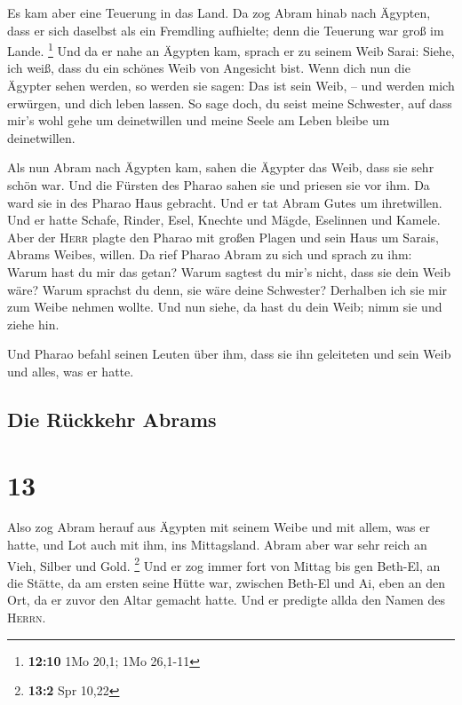  Es kam aber eine Teuerung in das Land. Da zog Abram
hinab nach Ägypten, dass er sich daselbst als ein Fremdling aufhielte;
denn die Teuerung war groß im Lande. \footnote{\textbf{12:10} 1Mo 20,1;
  1Mo 26,1-11}  Und da er nahe an Ägypten kam, sprach er
zu seinem Weib Sarai: Siehe, ich weiß, dass du ein schönes Weib von
Angesicht bist.  Wenn dich nun die Ägypter sehen werden,
so werden sie sagen: Das ist sein Weib, -- und werden mich erwürgen, und
dich leben lassen.  So sage doch, du seist meine
Schwester, auf dass mir's wohl gehe um deinetwillen und meine Seele am
Leben bleibe um deinetwillen.

 Als nun Abram nach Ägypten kam, sahen die Ägypter das
Weib, dass sie sehr schön war.  Und die Fürsten des
Pharao sahen sie und priesen sie vor ihm. Da ward sie in des Pharao Haus
gebracht.  Und er tat Abram Gutes um ihretwillen. Und er
hatte Schafe, Rinder, Esel, Knechte und Mägde, Eselinnen und Kamele.
 Aber der \textsc{Herr} plagte den Pharao mit großen
Plagen und sein Haus um Sarais, Abrams Weibes, willen. 
Da rief Pharao Abram zu sich und sprach zu ihm: Warum hast du mir das
getan? Warum sagtest du mir's nicht, dass sie dein Weib wäre?
 Warum sprachst du denn, sie wäre deine Schwester?
Derhalben ich sie mir zum Weibe nehmen wollte. Und nun siehe, da hast du
dein Weib; nimm sie und ziehe hin.

 Und Pharao befahl seinen Leuten über ihm, dass sie ihn
geleiteten und sein Weib und alles, was er hatte.

\hypertarget{die-ruxfcckkehr-abrams}{%
\subsection{Die Rückkehr Abrams}\label{die-ruxfcckkehr-abrams}}

\hypertarget{section-12}{%
\section{13}\label{section-12}}

 Also zog Abram herauf aus Ägypten mit seinem Weibe und
mit allem, was er hatte, und Lot auch mit ihm, ins Mittagsland.
 Abram aber war sehr reich an Vieh, Silber und Gold.
\footnote{\textbf{13:2} Spr 10,22}  Und er zog immer fort
von Mittag bis gen Beth-El, an die Stätte, da am ersten seine Hütte war,
zwischen Beth-El und Ai,  eben an den Ort, da er zuvor den
Altar gemacht hatte. Und er predigte allda den Namen des \textsc{Herrn}.

